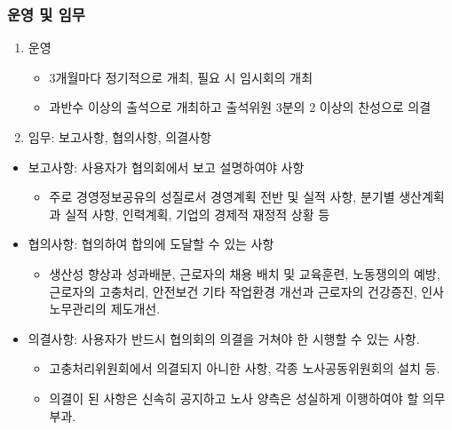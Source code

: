 \documentclass[aspectratio=169,xcolor=dvipsnames,handout]{beamer}
\begin{document}
\begin{frame}[allowframebreaks]
    \frametitle{운영 및 임무}
    \begin{enumerate}[<+->]
        \item 운영
        \begin{itemize}[<+->]
            \item 3개월마다 정기적으로 개최, 필요 시 임시회의 개최
            \item 과반수 이상의 출석으로 개최하고 출석위원 3분의 2 이상의 찬성으로 의결
        \end{itemize}
        \item 임무: 보고사항, 협의사항, 의결사항
    \end{enumerate}
    \begin{itemize}[<+->]
        \item 보고사항: 사용자가 협의회에서 보고 설명하여야 사항
        \begin{itemize}[<+->]
            \item 주로 경영정보공유의 성질로서 경영계획 전반 및 실적 사항, 분기별 생산계획과 실적 사항, 인력계획, 기업의 경제적 재정적 상황 등
        \end{itemize}
    \framebreak\relax
    \item 협의사항: 협의하여 합의에 도달할 수 있는 사항
        \begin{itemize}[<+->]
            \item 생산성 향상과 성과배분, 근로자의 채용 배치 및 교육훈련, 노동쟁의의 예방, 근로자의 고충처리, 안전보건 기타 작업환경 개선과 근로자의 건강증진, 인사노무관리의 제도개선.
        \end{itemize}
    \item 의결사항: 사용자가 반드시 협의회의 의결을 거쳐야 한 시행할 수 있는 사항.
        \begin{itemize}[<+->]
            \item 고충처리위원회에서 의결되지 아니한 사항, 각종 노사공동위원회의 설치 등.
            \item 의결이 된 사항은 신속히 공지하고 노사 양측은 성실하게 이행하여야 할 의무 부과.
        \end{itemize}
    \end{itemize}
\end{frame}
\end{document}
